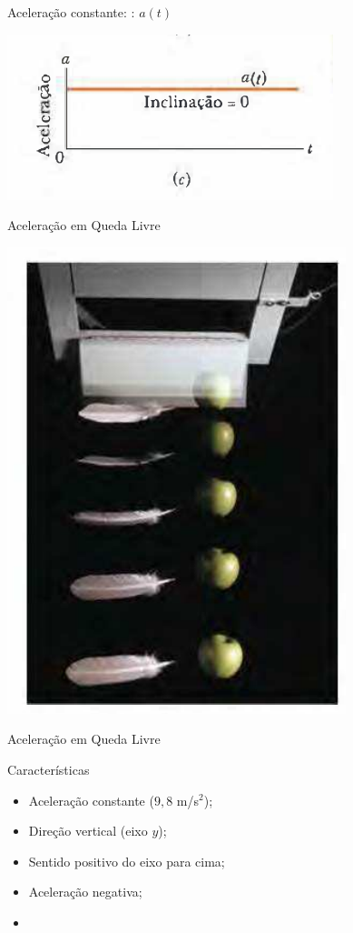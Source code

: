 \documentclass[xcolor=dvipsnames,table]{beamer}
\begin{document}
	\begin{frame}{Aceleração constante: : $a(t)$}
		\begin{center}
			\includegraphics[scale=0.7]{images/fig2-8c}
		\end{center}
	\end{frame}

	\begin{frame}{Aceleração em Queda Livre}
		\begin{center}
			\includegraphics[scale=0.5]{images/fig2-10}
		\end{center}
	\end{frame}

	\begin{frame}{Aceleração em Queda Livre}
		\begin{block}{Características} \pause
			\begin{itemize}
				\item Aceleração constante ($9,8$ m/s$^2$); \pause
				\item Direção vertical (eixo $y$); \pause
				\item Sentido positivo do eixo para cima; \pause
				\item Aceleração negativa; \pause
				\item 
			\end{itemize}
		\end{block}
	\end{frame}
\end{document}

